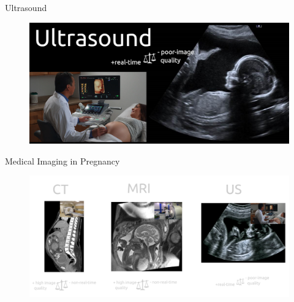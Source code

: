 {
\begin{frame}{Ultrasound}
      \begin{figure}
        \centering
        \includegraphics[width=1.0\textwidth]{./figures/medical-imaging-in-pregnancy/us/versions/drawing-v01.png}
      \end{figure}
\end{frame}
}


{
\begin{frame}{Medical Imaging in Pregnancy}
      \begin{figure}
        \centering
        \includegraphics[width=1.0\textwidth]{./figures/medical-imaging-in-pregnancy/ct-mr-us/versions/drawing-v02.png}
      \end{figure}
\end{frame}
}




